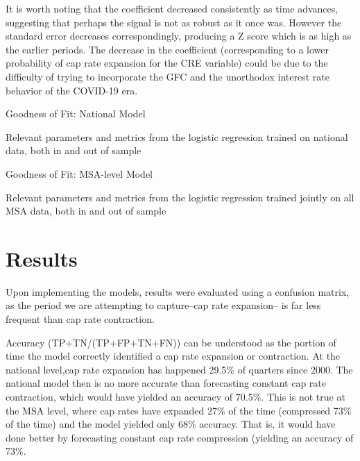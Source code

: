 It is worth noting that the coefficient decreased consistently as time advances, suggesting that perhaps the signal is not as robust as it once was. However the standard error decreases correspondingly, producing a Z score which is as high as the earlier periods. The decrease in the coefficient (corresponding to a lower probability of cap rate expansion for the CRE variable) could be due to the difficulty of trying to incorporate the GFC and the unorthodox interest rate behavior of the COVID-19 era. 

\begin{table}[H]
\centering
\caption*{Goodness of Fit: National Model}
\centering
\caption{Relevant parameters and metrics from the logistic regression trained on national data, both in and out of sample}
\end{table}

\begin{table}[H]
\centering
\caption*{Goodness of Fit: MSA-level Model}
\caption{Relevant parameters and metrics from the logistic regression trained jointly on all MSA data, both in and out of sample}
\end{table}



\section{Results}

Upon implementing the models, results were evaluated using a confusion matrix, as the period we are attempting to capture--cap rate expansion-- is far less frequent than cap rate contraction. 

Accuracy (TP+TN/(TP+FP+TN+FN)) can be understood as the portion of time the model correctly identified a cap rate expansion or contraction. At the national level,cap rate expansion has happened 29.5\% of quarters since 2000. The national model then is no more accurate than forecasting constant cap rate contraction, which would have yielded an accuracy of 70.5\%. This is not true at the MSA level, where cap rates have expanded 27\% of the time (compressed 73\% of the time) and the model yielded only 68\% accuracy. That is, it would have done better by forecasting constant cap rate compression (yielding an accuracy of 73\%.

